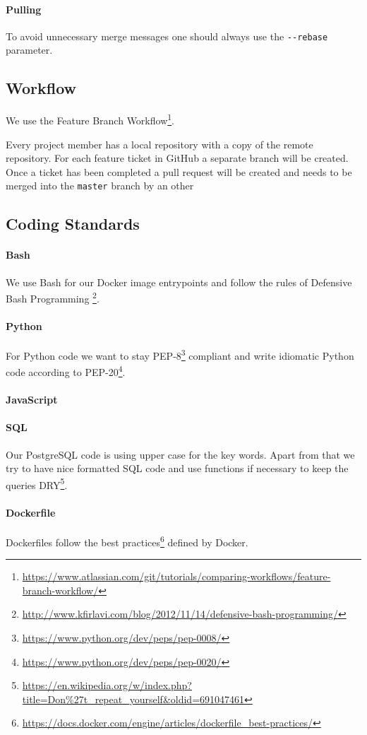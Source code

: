 \paragraph{Pulling}
To avoid unnecessary merge messages one should always use the
\texttt{-\/-rebase} parameter.

\subsection{Workflow}\label{workflow}
We use the Feature Branch Workflow\footnote{\url{https://www.atlassian.com/git/tutorials/comparing-workflows/feature-branch-workflow/}}.

Every project member has a local repository with a copy of the remote
repository. For each feature ticket in GitHub a separate branch
will be created. Once a ticket has been completed a pull request will be
created and needs to be merged into the \texttt{master} branch by an other 

\subsection{Coding Standards}

\paragraph{Bash} We use Bash for our Docker image entrypoints and follow
the rules of Defensive Bash Programming \footnote{\url{http://www.kfirlavi.com/blog/2012/11/14/defensive-bash-programming/}}.

\paragraph{Python} For Python code we want to stay PEP-8\footnote{\url{https://www.python.org/dev/peps/pep-0008/}} compliant and write idiomatic Python code according to PEP-20\footnote{\url{https://www.python.org/dev/peps/pep-0020/}}.

\paragraph{JavaScript}


\paragraph{SQL} Our PostgreSQL code is using upper case for the key words. Apart from that we try to have nice formatted SQL code and use functions
if necessary to keep the queries DRY\footnote{\url{https://en.wikipedia.org/w/index.php?title=Don%27t_repeat_yourself&oldid=691047461}}.

\paragraph{Dockerfile} Dockerfiles follow the best practices\footnote{\url{https://docs.docker.com/engine/articles/dockerfile_best-practices/}} defined by Docker.

